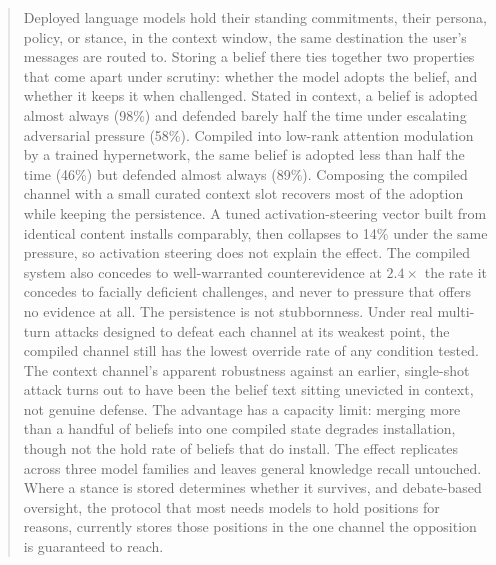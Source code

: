\begin{abstract}
Deployed language models hold their standing commitments, their persona, policy, or
stance, in the context window, the same destination the user's messages are routed to.
Storing a belief there ties together two properties that come apart under scrutiny:
whether the model adopts the belief, and whether it keeps it when challenged. Stated in context, a belief is adopted
almost always (98\%) and defended barely half the time under escalating adversarial
pressure (58\%). Compiled into low-rank attention modulation by a trained hypernetwork,
the same belief is adopted less than half the time (46\%) but defended almost always
(89\%). Composing the compiled channel with a small curated context slot recovers most
of the adoption while keeping the persistence. A tuned activation-steering vector built
from identical content installs comparably, then collapses to 14\% under the same
pressure, so activation steering does not explain the effect. The compiled system also
concedes to well-warranted counterevidence at \(2.4\times\) the rate it concedes to
facially deficient challenges, and never to pressure that offers no evidence at all.
The persistence is not stubbornness. Under real multi-turn attacks designed to
defeat each channel at its weakest point, the compiled channel still has the lowest
override rate of any condition tested. The context channel's apparent robustness
against an earlier, single-shot attack turns out to have been the belief text sitting
unevicted in context, not genuine defense. The advantage has a capacity
limit: merging more than a handful of beliefs into one compiled state degrades
installation, though not the hold rate of beliefs that do install. The effect
replicates across three model families and leaves general knowledge recall untouched.
Where a stance is stored
determines whether it survives, and debate-based oversight, the protocol that most needs
models to hold positions for reasons, currently stores those positions in the one
channel the opposition is guaranteed to reach.
\end{abstract}
